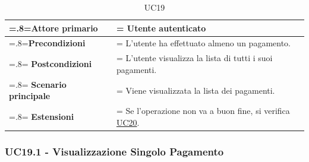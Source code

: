             \begin{table}[H]
                \centering
                \renewcommand{\arraystretch}{1.8}
                \renewcommand\tabularxcolumn[1]{m{#1}}
                \begin{tabularx}{0.9\textwidth} {
                    >{\hsize=.8\hsize\linewidth=\hsize}X
                    >{\hsize=1.2\hsize\linewidth=\hsize}X}
                    \hline
                    \textbf{Attore primario} & Utente autenticato \\
                    \hline
                    \textbf{Precondizioni} & L'utente ha effettuato almeno un pagamento. \\
                    \hline
                    \textbf{Postcondizioni} & L'utente visualizza la lista di tutti i suoi pagamenti. \\
                    \hline
                    \textbf{Scenario principale} & Viene visualizzata la lista dei pagamenti. \\
                    \hline
                    \textbf{Estensioni} & Se l'operazione non va a buon fine, si verifica \hyperref[UC20]{UC20}. \\
                    \hline
                \end{tabularx}
                \caption{UC19}
            \end{table}

        \subsubsection{UC19.1 - Visualizzazione Singolo Pagamento}
        \label{UC19.1}

